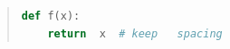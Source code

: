 \begin{quote}
  \begin{lstlisting}[language=Python, frame=single]
def f(x):
    return  x  # keep   spacing
\end{lstlisting}
\end{quote}
